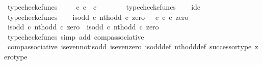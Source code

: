 \begin{isabellebody}
\ typecheck{\isacharunderscore}{\kern0pt}cfuncs\isanewline
\ \ \isamarkupfalse%
\ {\isachardoublequoteopen}{\isasymt}\ {\isasymcirc}\isactrlsub c\ {\isasymbeta}\isactrlbsub {\isasymnat}\isactrlsub c\isactrlesub \ {\isacharcolon}{\kern0pt}\ {\isasymnat}\isactrlsub c\ {\isasymrightarrow}\ {\isasymOmega}{\isachardoublequoteclose}\isanewline
\ \ \ \ \isamarkupfalse%
\ typecheck{\isacharunderscore}{\kern0pt}cfuncs\isanewline
\ \ \isamarkupfalse%
\ {\isachardoublequoteopen}id\isactrlsub c\ {\isasymOmega}\ {\isacharcolon}{\kern0pt}\ {\isasymOmega}\ {\isasymrightarrow}\ {\isasymOmega}{\isachardoublequoteclose}\isanewline
\ \ \ \ \isamarkupfalse%
\ typecheck{\isacharunderscore}{\kern0pt}cfuncs\isanewline
\isanewline
\ \ \isamarkupfalse%
\ {\isachardoublequoteopen}{\isacharparenleft}{\kern0pt}is{\isacharunderscore}{\kern0pt}odd\ {\isasymcirc}\isactrlsub c\ nth{\isacharunderscore}{\kern0pt}odd{\isacharparenright}{\kern0pt}\ {\isasymcirc}\isactrlsub c\ zero\ {\isacharequal}{\kern0pt}\ {\isacharparenleft}{\kern0pt}{\isasymt}\ {\isasymcirc}\isactrlsub c\ {\isasymbeta}\isactrlbsub {\isasymnat}\isactrlsub c\isactrlesub {\isacharparenright}{\kern0pt}\ {\isasymcirc}\isactrlsub c\ zero{\isachardoublequoteclose}\isanewline
\ \ \isamarkupfalse%
\ {\isacharminus}{\kern0pt}\isanewline
\ \ \ \ \isamarkupfalse%
\ {\isachardoublequoteopen}{\isacharparenleft}{\kern0pt}is{\isacharunderscore}{\kern0pt}odd\ {\isasymcirc}\isactrlsub c\ nth{\isacharunderscore}{\kern0pt}odd{\isacharparenright}{\kern0pt}\ {\isasymcirc}\isactrlsub c\ zero\ {\isacharequal}{\kern0pt}\ is{\isacharunderscore}{\kern0pt}odd\ {\isasymcirc}\isactrlsub c\ nth{\isacharunderscore}{\kern0pt}odd\ {\isasymcirc}\isactrlsub c\ zero{\isachardoublequoteclose}\isanewline
\ \ \ \ \ \ \isamarkupfalse%
\ {\isacharparenleft}{\kern0pt}typecheck{\isacharunderscore}{\kern0pt}cfuncs{\isacharcomma}{\kern0pt}\ simp\ add{\isacharcolon}{\kern0pt}\ comp{\isacharunderscore}{\kern0pt}associative{}{\isacharparenright}{\kern0pt}\isanewline
\ \ \ \ \isamarkupfalse%
\ \isamarkupfalse%
\ {\isachardoublequoteopen}{\isachardot}{\kern0pt}{\isachardot}{\kern0pt}{\isachardot}{\kern0pt}\ {\isacharequal}{\kern0pt}\ {\isasymt}{\isachardoublequoteclose}\isanewline
\ \ \ \ \ \ \isamarkupfalse%
\ comp{\isacharunderscore}{\kern0pt}associative{}\ is{\isacharunderscore}{\kern0pt}even{\isacharunderscore}{\kern0pt}not{\isacharunderscore}{\kern0pt}is{\isacharunderscore}{\kern0pt}odd\ is{\isacharunderscore}{\kern0pt}even{\isacharunderscore}{\kern0pt}zero\ is{\isacharunderscore}{\kern0pt}odd{\isacharunderscore}{\kern0pt}def{}\ nth{\isacharunderscore}{\kern0pt}odd{\isacharunderscore}{\kern0pt}def{}\ successor{\isacharunderscore}{\kern0pt}type\ zero{\isacharunderscore}{\kern0pt}type\ \isamarkupfalse%

\end{isabellebody}
